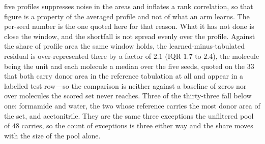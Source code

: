 five profiles suppresses noise in the areas and inflates a rank correlation, so that figure is a
property of the averaged profile and not of what an arm learns. The per-seed number is the one
quoted here for that reason. What it has not done is close the window, and the shortfall is
not spread evenly over the profile. Against the share of profile area the same window holds, the
learned-minus-tabulated residual is over-represented there by a factor of $2.1$ (IQR $1.7$ to
$2.4$), the molecule being the unit and each molecule a median over the five seeds, quoted on the
$33$ that both carry donor area in the reference tabulation at all and appear in a labelled test
row---so the comparison is neither against a baseline of zeros nor over molecules the scored set
never reaches. Three of the thirty-three fall below one: formamide and water, the two whose
reference carries the most donor area of the set, and acetonitrile. They are the same three
exceptions the unfiltered pool of $48$ carries, so the count of exceptions is three either way and
the share moves with the size of the pool alone.

